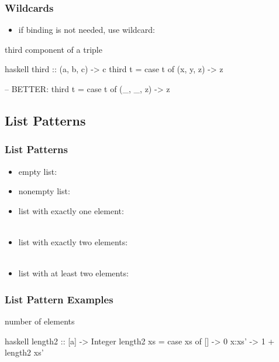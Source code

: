 \documentclass[dvipsnames]{beamer}
\theoremstyle{plain}
\begin{document}
\begin{frame}[fragile]
  \frametitle{Wildcards}

  \begin{itemize}
    \item if binding is not needed, use wildcard: 
  \end{itemize}

  \begin{exampleblock}{third component of a triple}
    \begin{pygments}{haskell}
third :: (a, b, c) -> c
third t =
    case t of
      (x, y, z) -> z

-- BETTER:
third t =
    case t of
      (_, _, z) -> z
    \end{pygments}
  \end{exampleblock}
\end{frame}

\subsection{List Patterns}

\begin{frame}[fragile]
  \frametitle{List Patterns}

  \begin{itemize}
    \item empty list:\\
    \item nonempty list:\\
    \item list with exactly one element:\\
      \\
    \item list with exactly two elements:\\
      \\
    \item list with at least two elements:\\
  \end{itemize}
\end{frame}

\begin{frame}[fragile]
  \frametitle{List Pattern Examples}

  \begin{exampleblock}{number of elements}
    \begin{pygments}{haskell}
length2 :: [a] -> Integer
length2 xs =
    case xs of
      []    -> 0
      x:xs' -> 1 + length2 xs'
    \end{pygments}
  \end{exampleblock}
\end{frame}
\end{document}
